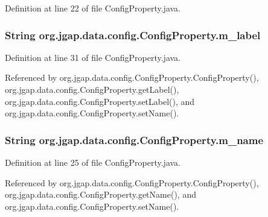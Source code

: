Definition at line 22 of file Config\-Property.\-java.

\hypertarget{classorg_1_1jgap_1_1data_1_1config_1_1_config_property_a2a545e9431b401be301a56134c6fcb0f}{
\subsubsection[{m\-\_\-label}]{\setlength{\rightskip}{0pt plus 5cm}String org.\-jgap.\-data.\-config.\-Config\-Property.\-m\-\_\-label\hspace{0.3cm}{\ttfamily [private]}}}\label{classorg_1_1jgap_1_1data_1_1config_1_1_config_property_a2a545e9431b401be301a56134c6fcb0f}


Definition at line 31 of file Config\-Property.\-java.



Referenced by org.\-jgap.\-data.\-config.\-Config\-Property.\-Config\-Property(), org.\-jgap.\-data.\-config.\-Config\-Property.\-get\-Label(), org.\-jgap.\-data.\-config.\-Config\-Property.\-set\-Label(), and org.\-jgap.\-data.\-config.\-Config\-Property.\-set\-Name().

\hypertarget{classorg_1_1jgap_1_1data_1_1config_1_1_config_property_a592ac64cc363fb50c9ac09c37ac640e6}{
\subsubsection[{m\-\_\-name}]{\setlength{\rightskip}{0pt plus 5cm}String org.\-jgap.\-data.\-config.\-Config\-Property.\-m\-\_\-name\hspace{0.3cm}{\ttfamily [private]}}}\label{classorg_1_1jgap_1_1data_1_1config_1_1_config_property_a592ac64cc363fb50c9ac09c37ac640e6}


Definition at line 25 of file Config\-Property.\-java.



Referenced by org.\-jgap.\-data.\-config.\-Config\-Property.\-Config\-Property(), org.\-jgap.\-data.\-config.\-Config\-Property.\-get\-Name(), and org.\-jgap.\-data.\-config.\-Config\-Property.\-set\-Name().

